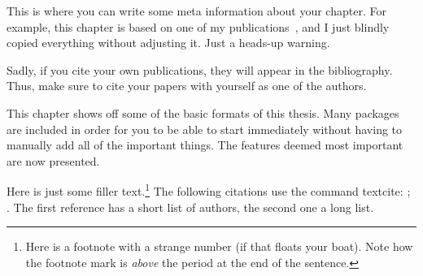 \begin{jointwork}
    This is where you can write some meta information about your chapter. For example, this chapter is based on one of my publications~\cite{firstDemoReference}, and I just blindly copied everything without adjusting it. Just a heads-up warning.
    
    Sadly, if you cite your own publications, they will appear in the bibliography. Thus, make sure to cite your papers with yourself as one of the authors.
\end{jointwork}

This chapter shows off some of the basic formats of this thesis. Many packages are included in order for you to be able to start immediately without having to manually add all of the important things. The features deemed most important are now presented.

Here is just some filler text.\footnote[-0.2][][15]{Here is a footnote with a strange number (if that floats your boat). Note how the footnote mark is \emph{above} the period at the end of the sentence.} The following citations use the command \textsf{textcite}: \textcite{firstDemoReference}; \textcite{secondDemoReference}. The first reference has a short list of authors, the second one a long list.

